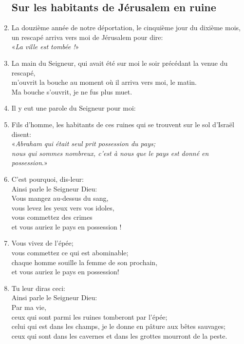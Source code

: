 \begin{enumerate}[leftmargin=\psleftmargin, labelsep = \pslabelsep, label={\arabic*}, font=\color{\pscolor}\small\textsuperscript, parsep=0em, itemsep=0em, topsep=0em ]
          \subsection*{Sur les habitants de Jérusalem en ruine}
    \item La douzième année de notre déportation, le cinquième jour du dixième mois,\\ un rescapé arriva vers moi de Jérusalem pour dire:  \\ \decalage «\textit{La ville est tombée !}»
    \item La main du Seigneur, qui avait été sur moi le soir précédant la venue du rescapé, \\ m’ouvrit la bouche au moment où il arriva vers moi, le matin. \\ Ma bouche s’ouvrit, je ne fus plus muet. \verseSpace
    \item Il y eut une parole du Seigneur pour moi:
    \item Fils d’homme, les habitants de ces ruines qui se trouvent sur le sol d’Israël disent: \\\decalage  «\textit{Abraham qui était seul prit possession du pays; \\ \decalage nous qui sommes nombreux, c’est à nous que le pays est donné en possession}.» \verseSpace
    \item C’est pourquoi, dis-leur: \\ Ainsi parle le Seigneur Dieu: \\ Vous mangez au-dessus du sang, \\ vous levez les yeux vers vos idoles, \\ vous commettez des crimes \\ et vous auriez le pays en possession !
    \item Vous vivez de l’épée; \\ vous commettez ce qui est abominable; \\ chaque homme souille la femme de son prochain, \\ et vous auriez le pays en possession! \verseSpace
    \item Tu leur diras ceci: \\ Ainsi parle le Seigneur Dieu: \\ Par ma vie, \\ ceux qui sont parmi les ruines tomberont par l’épée; \\ celui qui est dans les champs, je le donne en pâture aux bêtes sauvages; \\ ceux qui sont dans les cavernes et dans les grottes mourront de la peste.

\end{enumerate}
